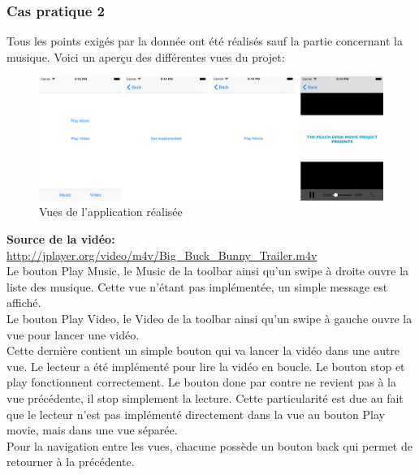 \subsubsection{Cas pratique 2}
Tous les points exigés par la donnée ont été réalisés sauf la partie concernant la musique. Voici un aperçu des différentes vues du projet:
\begin{figure}[H]
	\begin{center}
		\includegraphics[width=16.5cm]{img/cas2_0.png}
		\caption{Vues de l'application réalisée}
		\label{vues3}
	\end{center}
\end{figure}
\textbf{Source de la vidéo:\\}
\url{http://jplayer.org/video/m4v/Big_Buck_Bunny_Trailer.m4v}\\

Le bouton Play Music, le Music de la toolbar ainsi qu'un swipe à droite ouvre la liste des musique. Cette vue n'étant pas implémentée, un simple message est affiché. \\
Le bouton Play Video, le Video de la toolbar ainsi qu'un swipe à gauche ouvre la vue pour lancer une vidéo.\\
Cette dernière contient un simple bouton qui va lancer la vidéo dans une autre vue. Le lecteur a été implémenté pour lire la vidéo en boucle. Le bouton stop et play fonctionnent correctement. Le bouton done par contre ne revient pas à la vue précédente, il stop simplement la lecture. Cette particularité est due au fait que le lecteur n'est pas implémenté directement dans la vue au bouton Play movie, mais dans une vue séparée.\\
Pour la navigation entre les vues, chacune possède un bouton back qui permet de retourner à la précédente.

